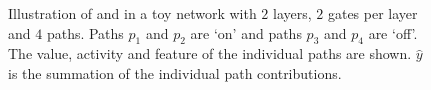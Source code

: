 \begin{figure}[h]
\centering
{}
\caption{Illustration of  and  in a  toy network with $2$ layers, $2$ gates per layer and $4$ paths. Paths $p_1$ and $p_2$ are `on' and paths $p_3$ and $p_4$ are `off'. The value, activity and feature of the individual paths are shown. $\hat{y}$ is the summation of the individual path contributions.}
\label{fig:paths}
\end{figure}

